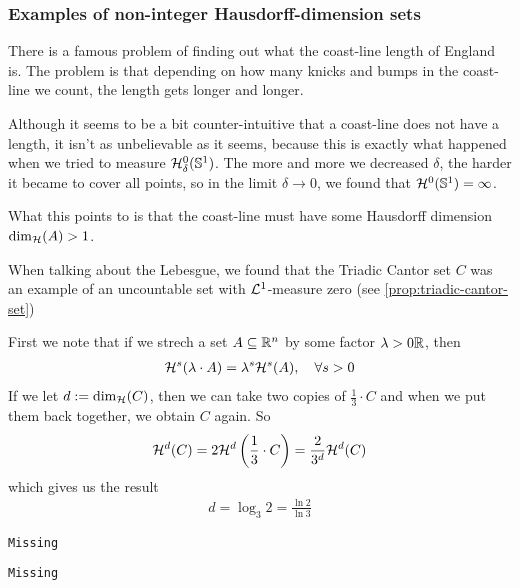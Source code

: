 \subsubsection*{Examples of non-integer Hausdorff-dimension sets}

There is a famous problem of finding out what the coast-line length of England is.
The problem is that depending on how many knicks and bumps in the coast-line we count, the length gets longer and longer.

Although it seems to be a bit counter-intuitive that a coast-line does not have a length, it isn't as unbelievable as it seems, because this is exactly what happened when we tried to measure $\mathcal{H}_{\delta}^{0}(\mathbb{S}^{1})$.
The more and more we decreased $\delta$, the harder it became to cover all points, so in the limit $\delta \to 0$, we found that $\mathcal{H}^{0}(\mathbb{S}^{1}) = \infty$.

What this points to is that the coast-line must have some Hausdorff dimension $\dim_{\mathcal{H}}(A) > 1$.


\begin{ex}
  When talking about the Lebesgue, we found that the Triadic Cantor set $C$ was an example of an uncountable set with $\mathcal{L}^{1}$-measure zero (see \ref{prop:triadic-cantor-set})

  First we note that if we strech a set $A \subseteq \mathbb{R}^{n}$ by some factor $\lambda > 0\mathbb{R}$, then
  \begin{align*}
    \mathcal{H}^{s}(\lambda \cdot A) = \lambda^{s} \mathcal{H}^{s}(A), \quad \forall s > 0
  \end{align*}
  If we let $d := \mathrm{dim}_{\mathcal{H}}(C)$, then we can take two copies of $\frac{1}{3} \cdot C$ and when we put them back together, we obtain $C$ again. So
  \begin{align*}
    \mathcal{H}^{d}(C) = 2 \mathcal{H}^{d}\left(
      \frac{1}{3} \cdot C
    \right)
    = \frac{2}{3^{d}} \mathcal{H}^{d}(C)
  \end{align*}
  which gives us the result
  \begin{align*}
    d = \log_3 2 = \frac{\ln 2}{\ln 3}
  \end{align*}
\end{ex}


\begin{ex}
\texttt{Missing}
\end{ex}


\begin{ex}
\texttt{Missing}
\end{ex}





